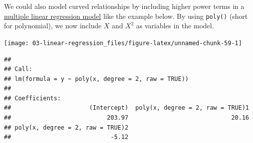 \documentclass[
]{book}
\newenvironment{Shaded}{\begin{snugshade}}{\end{snugshade}}
\newcommand{\DataTypeTok}[1]{\textcolor[rgb]{0.13,0.29,0.53}{#1}}
\newcommand{\DecValTok}[1]{\textcolor[rgb]{0.00,0.00,0.81}{#1}}
\newcommand{\KeywordTok}[1]{\textcolor[rgb]{0.13,0.29,0.53}{\textbf{#1}}}
\newcommand{\NormalTok}[1]{#1}
\newcommand{\OperatorTok}[1]{\textcolor[rgb]{0.81,0.36,0.00}{\textbf{#1}}}
\newcommand{\OtherTok}[1]{\textcolor[rgb]{0.56,0.35,0.01}{#1}}
\newcommand{\StringTok}[1]{\textcolor[rgb]{0.31,0.60,0.02}{#1}}
\begin{document}
We could also model curved relationships by including higher power terms in a \protect\hyperlink{multiple}{multiple linear regression model} like the example below. By using \texttt{poly()} (short for polynomial), we now include \(X\) and \(X^2\) as variables in the model.

\begin{Shaded}
\end{Shaded}

\begin{center}\texttt{[image: 03-linear-regression\_files/figure-latex/unnamed-chunk-59-1]} \end{center}

\begin{Shaded}
\end{Shaded}

\begin{verbatim}
## 
## Call:
## lm(formula = y ~ poly(x, degree = 2, raw = TRUE))
## 
## Coefficients:
##                      (Intercept)  poly(x, degree = 2, raw = TRUE)1  
##                           203.97                             20.16  
## poly(x, degree = 2, raw = TRUE)2  
##                            -5.12
\end{verbatim}
\end{document}
